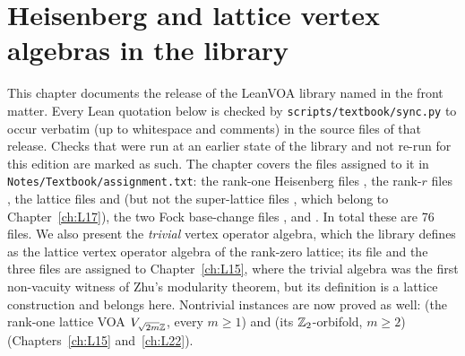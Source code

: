 \chapter{Heisenberg and lattice vertex algebras in the library}\label{ch:L05}
\begingroup\setlength{\emergencystretch}{3em}

\providecommand{\lfivevac}{\mathbf{1}}
\providecommand{\lfiveF}{\mathcal{F}}
\providecommand{\lfiveR}{\mathbb{R}}
\providecommand{\lfiveO}{O_2}
\providecommand{\lfiveA}{A_2}
\providecommand{\lfivesl}{\mathfrak{sl}_2}

This chapter documents the release of the LeanVOA library named in the front matter. Every Lean quotation below is checked by \texttt{scripts/textbook/sync.py}
to occur verbatim (up to whitespace and comments) in the source files of that release. Checks that were run at an earlier state of the library and not re-run for this edition are marked as such. The chapter covers the files assigned to it in
\texttt{Notes/Textbook/assignment.txt}: the rank-one Heisenberg files
, the rank-$r$ files
, the lattice files
 and
 (but not the super-lattice files
, which belong to Chapter~\ref{ch:L17}), the two Fock base-change files
, and
. In total these are 76 files.
We also present the \emph{trivial} vertex operator algebra, which the library defines as the lattice
vertex operator algebra of the rank-zero lattice; its file
 and the three
 files are assigned to Chapter~\ref{ch:L15}, where the trivial algebra was the
first non-vacuity witness of Zhu's modularity theorem, but its definition is a lattice construction and
belongs here. Nontrivial instances are now proved as well:  (the rank-one lattice
VOA $V_{\sqrt{2m}{\mathbb{Z}}}$, every $m\ge1$) and  (its ${\mathbb{Z}}_2$-orbifold, $m\ge2$)
(Chapters~\ref{ch:L15} and~\ref{ch:L22}).

